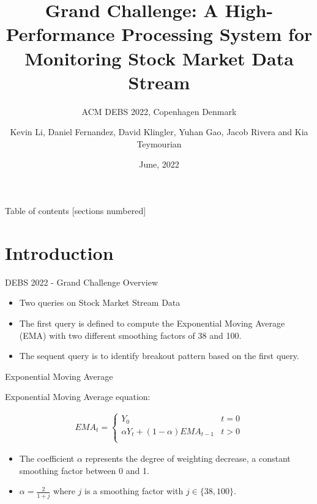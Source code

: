 \documentclass[9pt]{beamer}
\title{Grand Challenge: A High-Performance Processing System for Monitoring Stock Market Data Stream}
\subtitle{ACM  DEBS 2022, Copenhagen Denmark}
\date{June, 2022}
\author{\footnotesize{Kevin Li, Daniel Fernandez, David Klingler, Yuhan Gao, Jacob Rivera and Kia Teymourian}}
\institute{The University of Texas at Austin}
\begin{document}
\maketitle





\begin{frame}{Table of contents}
  [sections numbered]
 \tableofcontents[hideallsubsections]
\end{frame}



\section{Introduction}

\begin{frame}[fragile]{DEBS 2022 - Grand Challenge Overview}

\begin{itemize}
    \item Two queries on Stock Market Stream Data
    \item The first query is defined to compute the Exponential Moving Average (EMA) with two different smoothing factors of 38 and 100.
    \item The sequent query is to identify breakout pattern based on the first query. 
\end{itemize}
    
\end{frame}

\begin{frame}[fragile]{Exponential Moving Average }
    
    Exponential Moving Average equation:

    \begin{align*}
        EMA_t = \begin{cases}
            Y_0 &  t = 0 \\
            \alpha Y_t + (1-\alpha) EMA_{t-1}& t>0 \\
            \end{cases}
    \end{align*}
    
    \begin{itemize}
        \item The coefficient $\alpha$ represents the degree of weighting decrease, a constant smoothing factor between 0 and 1.
        \item $\alpha = \frac{2}{1+j}$ where $j$ is a smoothing factor with $j \in \{38, 100 \}$.
    \end{itemize}
    
    
\end{frame}
\end{document}
